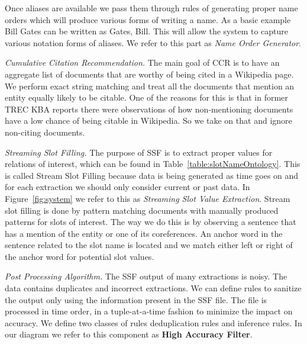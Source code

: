 Once aliases are available we pass them through rules of generating proper name orders which will produce various forms of writing a name. As a basic example Bill Gates can be written as Gates, Bill. This will allow the system to capture various notation forms of aliases. We refer to this part as \textit{Name Order Generator}.

\textit{Cumulative Citation Recommendation.}
The main goal of CCR is to have an aggregate list of documents that are worthy of being cited in a Wikipedia page. We perform exact string matching and treat all the documents that mention an entity equally likely to be citable. One of the reasons for this is that in former TREC KBA reports \cite{JFrank12} there were observations of how non-mentioning documents have a low chance of being citable in Wikipedia. So we take on that and ignore non-citing documents. 






\textit{Streaming Slot Filling.}
The purpose of SSF is to extract proper values for relations of interest, which can be found in Table~\ref{table:slotNameOntology}. This is called Stream Slot Filling because data is being generated as time goes
on and for each extraction we should only consider current or past data. In Figure~\ref{fig:system} we refer to this as \textit{Streaming Slot Value Extraction}. Stream slot filling is done by pattern matching documents with manually produced patterns for slots of interest. The way we do this is by observing a sentence that has a mention of the entity or one of its coreferences. An anchor word in the sentence related to the slot name is located and we match either left or right of the anchor word for potential slot values. 

\textit{Post Processing Algorithm.}
The SSF output of many extractions is noisy. The data contains duplicates and incorrect extractions. We can define rules to sanitize the output only using the information present in the SSF file. The file is processed in time order, in a tuple-at-a-time fashion to minimize the impact on accuracy. We define two classes of rules deduplication rules and inference rules. In our diagram we refer to this component as \textbf{High Accuracy Filter}.

